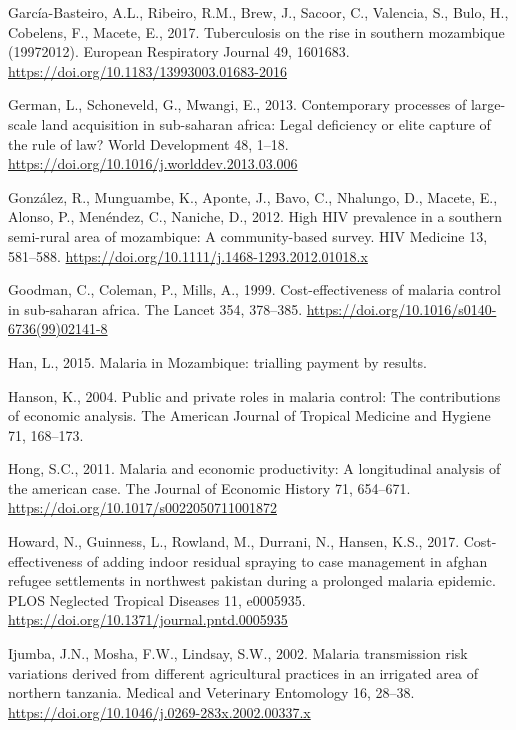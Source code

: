 \documentclass[]{article}
\begin{document}
\hypertarget{ref-GarcaBasteiro2017}{}
García-Basteiro, A.L., Ribeiro, R.M., Brew, J., Sacoor, C., Valencia,
S., Bulo, H., Cobelens, F., Macete, E., 2017. Tuberculosis on the rise
in southern mozambique (19972012). European Respiratory Journal 49,
1601683. \url{https://doi.org/10.1183/13993003.01683-2016}

\hypertarget{ref-German2013}{}
German, L., Schoneveld, G., Mwangi, E., 2013. Contemporary processes of
large-scale land acquisition in sub-saharan africa: Legal deficiency or
elite capture of the rule of law? World Development 48, 1--18.
\url{https://doi.org/10.1016/j.worlddev.2013.03.006}

\hypertarget{ref-Gonzlez2012}{}
González, R., Munguambe, K., Aponte, J., Bavo, C., Nhalungo, D., Macete,
E., Alonso, P., Menéndez, C., Naniche, D., 2012. High HIV prevalence in
a southern semi-rural area of mozambique: A community-based survey. HIV
Medicine 13, 581--588.
\url{https://doi.org/10.1111/j.1468-1293.2012.01018.x}

\hypertarget{ref-Goodman1999}{}
Goodman, C., Coleman, P., Mills, A., 1999. Cost-effectiveness of malaria
control in sub-saharan africa. The Lancet 354, 378--385.
\url{https://doi.org/10.1016/s0140-6736(99)02141-8}

\hypertarget{ref-Han}{}
Han, L., 2015. Malaria in Mozambique: trialling payment by results.

\hypertarget{ref-Hanson2004}{}
Hanson, K., 2004. Public and private roles in malaria control: The
contributions of economic analysis. The American Journal of Tropical
Medicine and Hygiene 71, 168--173.

\hypertarget{ref-Hong2011}{}
Hong, S.C., 2011. Malaria and economic productivity: A longitudinal
analysis of the american case. The Journal of Economic History 71,
654--671. \url{https://doi.org/10.1017/s0022050711001872}

\hypertarget{ref-Howard_2017}{}
Howard, N., Guinness, L., Rowland, M., Durrani, N., Hansen, K.S., 2017.
Cost-effectiveness of adding indoor residual spraying to case management
in afghan refugee settlements in northwest pakistan during a prolonged
malaria epidemic. PLOS Neglected Tropical Diseases 11, e0005935.
\url{https://doi.org/10.1371/journal.pntd.0005935}

\hypertarget{ref-Ijumba2002}{}
Ijumba, J.N., Mosha, F.W., Lindsay, S.W., 2002. Malaria transmission
risk variations derived from different agricultural practices in an
irrigated area of northern tanzania. Medical and Veterinary Entomology
16, 28--38. \url{https://doi.org/10.1046/j.0269-283x.2002.00337.x}
\end{document}
